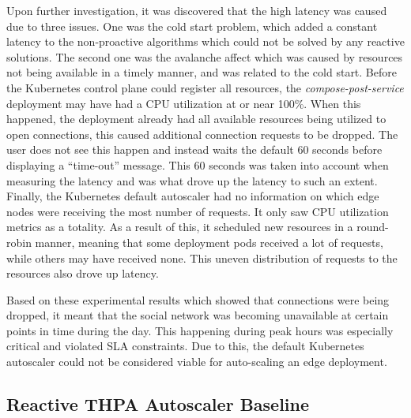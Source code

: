 Upon further investigation, it was discovered that the high latency was caused due to three issues. One was the cold start problem, which added a constant latency to the non-proactive algorithms which could not be solved by any reactive solutions. The second one was the avalanche affect which was caused by resources not being available in a timely manner, and was related to the cold start. Before the Kubernetes control plane could register all resources, the \textit{compose-post-service} deployment may have had a CPU utilization at or near 100\%. When this happened, the deployment already had all available resources being utilized to open connections, this caused additional connection requests to be dropped. The user does not see this happen and instead waits the default 60 seconds before displaying a ``time-out'' message. This 60 seconds was taken into account when measuring the latency and was what drove up the latency to such an extent. Finally, the Kubernetes default autoscaler had no information on which edge nodes were receiving the most number of requests. It only saw CPU utilization metrics as a totality. As a result of this, it scheduled new resources in a round-robin manner, meaning that some deployment pods received a lot of requests, while others may have received none. This uneven distribution of requests to the resources also drove up latency.\par

Based on these experimental results which showed that connections were being dropped, it meant that the social network was becoming unavailable at certain points in time during the day. This happening during peak hours was especially critical and violated SLA constraints. Due to this, the default Kubernetes autoscaler could not be considered viable for auto-scaling an edge deployment.

\subsection {Reactive THPA Autoscaler Baseline}
\label{subsec:ch5-reactive-algo}

